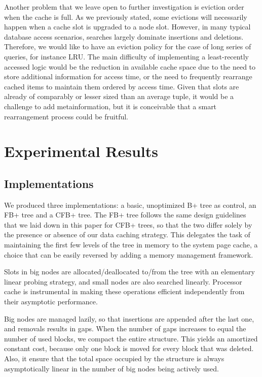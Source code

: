 \documentclass{article}
\begin{document}
Another problem that we leave open to further investigation is eviction order when the cache is full.
As we previously stated, some evictions will necessarily happen when a cache slot is upgraded to a node slot.
However, in many typical database access scenarios, searches largely dominate insertions and deletions.
Therefore, we would like to have an eviction policy for the case of long series of queries, for instance LRU.
The main difficulty of implementing a least-recently accessed logic would be the reduction
in available cache space due to the need to store additional information for access time,
or the need to frequently rearrange cached items to maintain them ordered by access time.
Given that slots are already of comparably or lesser sized than an average tuple, it would be a challenge
to add metainformation, but it is conceivable that a smart rearrangement process could be fruitful.

\section{Experimental Results}

\subsection{Implementations}
We produced three implementations: a basic, unoptimized B+ tree as control, an FB+ tree and a CFB+ tree.
The FB+ tree follows the same design guidelines that we laid down in this paper for CFB+ trees,
so that the two differ solely by the presence or absence of our data caching strategy.
This delegates the task of maintaining the first few levels of the tree in memory to the system page cache,
a choice that can be easily reversed by adding a memory management framework.

Slots in big nodes are allocated/deallocated to/from the tree with an elementary linear probing strategy,
and small nodes are also searched linearly.
Processor cache is instrumental in making these operations efficient independently from their asymptotic performance.

Big nodes are managed lazily, so that insertions are appended after the last one, and removals results in gaps.
When the number of gaps increases to equal the number of used blocks, we compact the entire structure.
This yields an amortized constant cost, because only one block is moved for every block that was deleted.
Also, it ensure that the total space occupied by the structure is always asymptotically linear in the number
of big nodes being actively used.
\end{document}

